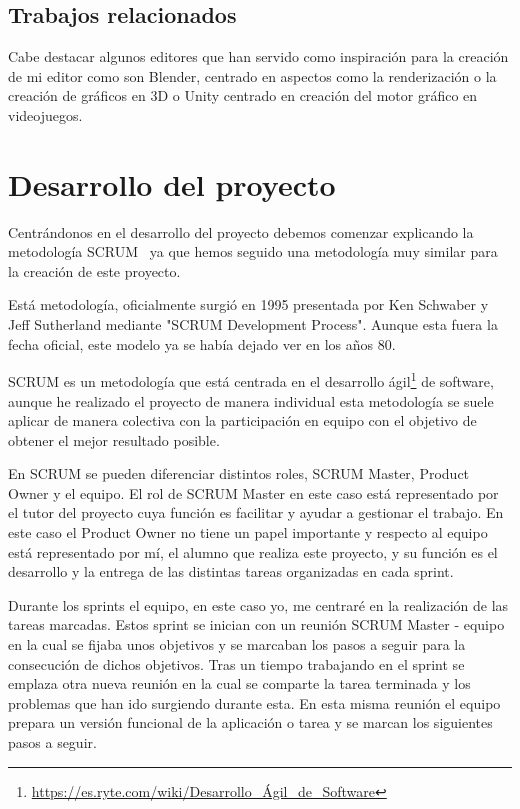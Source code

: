 \documentclass[a4paper, 12pt]{book}
\begin{document}
\section{Trabajos relacionados} %
\label{sec:Otros}
Cabe destacar algunos editores que han servido como inspiración para la creación de mi editor como son Blender, centrado en aspectos como la renderización o la creación de gráficos en 3D o Unity centrado en creación del motor gráfico en videojuegos. 


\cleardoublepage
\chapter{Desarrollo del proyecto}
\label{chap:Desarrollo del proyecto}
Centrándonos en el desarrollo del proyecto debemos comenzar explicando la metodología SCRUM~\cite{proyectos} ya que hemos seguido una metodología muy similar para la creación de este proyecto.

Está metodología, oficialmente surgió en 1995 presentada por Ken Schwaber y Jeff Sutherland mediante "SCRUM Development Process". Aunque esta fuera la fecha oficial, este modelo ya se había dejado ver en los años 80.

SCRUM es un metodología que está centrada en el desarrollo ágil\footnote{\url{https://es.ryte.com/wiki/Desarrollo_Ágil_de_Software}}  de software, aunque he realizado el proyecto de manera individual esta metodología se suele aplicar de manera colectiva con la participación en equipo con el objetivo de obtener el mejor resultado posible.

En SCRUM se pueden diferenciar distintos roles, SCRUM Master, Product Owner y el equipo. El rol de SCRUM Master en este caso está representado por el tutor del proyecto cuya función es facilitar y ayudar a gestionar el trabajo. En este caso el Product Owner no tiene un papel importante y respecto al equipo está representado por mí, el alumno que realiza este proyecto, y su función es el desarrollo y la entrega de las distintas tareas organizadas en cada sprint.

Durante los sprints el equipo, en este caso yo, me centraré en la realización de las tareas marcadas. Estos sprint se inician con un reunión SCRUM Master - equipo en la cual se fijaba unos objetivos y se marcaban los pasos a seguir para la consecución de dichos objetivos. Tras un tiempo trabajando en el sprint se emplaza otra nueva reunión en la cual se comparte la tarea terminada y los problemas que han ido surgiendo durante esta. En esta misma reunión el equipo prepara un versión funcional de la aplicación o tarea y se marcan los siguientes pasos a seguir. 
\end{document}
